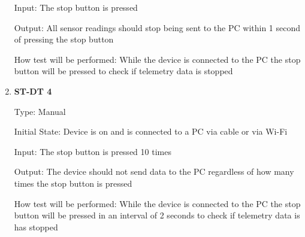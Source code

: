 \documentclass[12pt, titlepage]{article}
\begin{document}
\begin{enumerate}
  Input: The stop button is pressed
            
  Output: All sensor readings should stop being sent to the PC within 1 second of pressing the stop button
  
            
  How test will be performed: While the device is connected to the PC the stop button will be pressed to check if telemetry data is stopped\\

  \item{\bf{ST-DT 4}}
  
  Type: Manual
            
  Initial State: Device is on and is connected to a PC via cable or via Wi-Fi
            
  Input: The stop button is pressed 10 times
            
  Output: The device should not send data to the PC regardless of how many times the stop button is pressed
  
            
  How test will be performed: While the device is connected to the PC the stop button will be pressed in an interval of 2 seconds to check if telemetry data is has stopped\\

  \end{enumerate}
\end{document}
